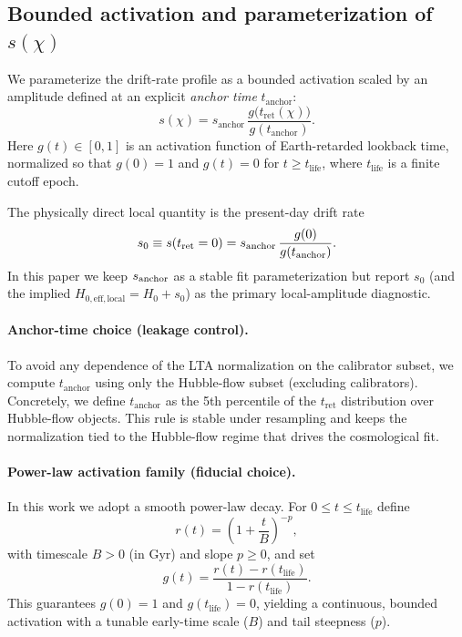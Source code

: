 \documentclass[10pt]{article}
\newcommand{\chis}{\chi}
\newcommand{\sofchi}{s(\chis)}
\newcommand{\tret}{t_{\mathrm{ret}}}
\newcommand{\tL}{t_{\mathrm{life}}}
\newcommand{\tA}{t_{\mathrm{anchor}}}
\begin{document}
\subsection{Bounded activation and parameterization of $\sofchi$}
\label{sec:earth_history2}

We parameterize the drift-rate profile as a bounded activation scaled by an amplitude defined at an
explicit \emph{anchor time} $\tA$:
\begin{equation}
\sofchi = s_{\mathrm{anchor}}\,
\frac{g\!\bigl(\tret(\chis)\bigr)}{g(\tA)}.
\label{eq:s_profile2}
\end{equation}
Here $g(t)\in[0,1]$ is an activation function of Earth-retarded lookback time, normalized so that
$g(0)=1$ and $g(t)=0$ for $t\ge \tL$, where $\tL$ is a finite cutoff epoch.

The physically direct local quantity is the present-day drift rate
\begin{equation}
s_0 \equiv s(\tret=0)=s_{\rm anchor}\,\frac{g(0)}{g(\tA)}.
\end{equation}
In this paper we keep \(s_{\rm anchor}\) as a stable fit parameterization but report \(s_0\) (and
the implied \(H_{0,\mathrm{eff,local}}=H_0+s_0\)) as the primary local-amplitude diagnostic.

\paragraph{Anchor-time choice (leakage control).}
To avoid any dependence of the LTA normalization on the calibrator subset, we compute $\tA$ using
only the Hubble-flow subset (excluding calibrators). Concretely, we define $\tA$ as the 5th
percentile of the $\tret$ distribution over Hubble-flow objects. This rule is stable under
resampling and keeps the normalization tied to the Hubble-flow regime that drives the cosmological fit.

\paragraph{Power-law activation family (fiducial choice).}
In this work we adopt a smooth power-law decay. For $0\le t\le \tL$ define
\begin{equation}
r(t) = \left(1+\frac{t}{B}\right)^{-p},
\end{equation}
with timescale $B>0$ (in $\mathrm{Gyr}$) and slope $p\ge 0$, and set
\begin{equation}
g(t)=\frac{r(t)-r(\tL)}{1-r(\tL)}.
\label{eq:g_powerlaw2}
\end{equation}
This guarantees $g(0)=1$ and $g(\tL)=0$, yielding a continuous, bounded activation with a tunable
early-time scale ($B$) and tail steepness ($p$).
\end{document}
